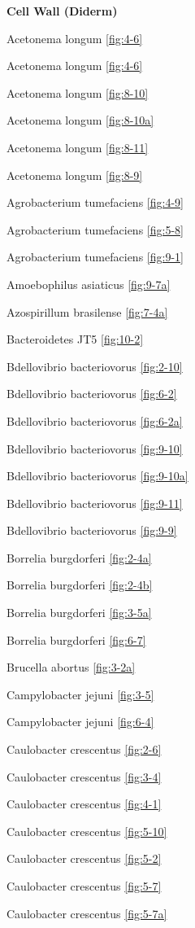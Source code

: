 \documentclass[]{tufte-book}
\begin{document}
\textbf{Cell Wall (Diderm)}

Acetonema longum \ref{fig:4-6}

Acetonema longum \ref{fig:4-6}

Acetonema longum \ref{fig:8-10}

Acetonema longum \ref{fig:8-10a}

Acetonema longum \ref{fig:8-11}

Acetonema longum \ref{fig:8-9}

Agrobacterium tumefaciens \ref{fig:4-9}

Agrobacterium tumefaciens \ref{fig:5-8}

Agrobacterium tumefaciens \ref{fig:9-1}

Amoebophilus asiaticus \ref{fig:9-7a}

Azospirillum brasilense \ref{fig:7-4a}

Bacteroidetes JT5 \ref{fig:10-2}

Bdellovibrio bacteriovorus \ref{fig:2-10}

Bdellovibrio bacteriovorus \ref{fig:6-2}

Bdellovibrio bacteriovorus \ref{fig:6-2a}

Bdellovibrio bacteriovorus \ref{fig:9-10}

Bdellovibrio bacteriovorus \ref{fig:9-10a}

Bdellovibrio bacteriovorus \ref{fig:9-11}

Bdellovibrio bacteriovorus \ref{fig:9-9}

Borrelia burgdorferi \ref{fig:2-4a}

Borrelia burgdorferi \ref{fig:2-4b}

Borrelia burgdorferi \ref{fig:3-5a}

Borrelia burgdorferi \ref{fig:6-7}

Brucella abortus \ref{fig:3-2a}

Campylobacter jejuni \ref{fig:3-5}

Campylobacter jejuni \ref{fig:6-4}

Caulobacter crescentus \ref{fig:2-6}

Caulobacter crescentus \ref{fig:3-4}

Caulobacter crescentus \ref{fig:4-1}

Caulobacter crescentus \ref{fig:5-10}

Caulobacter crescentus \ref{fig:5-2}

Caulobacter crescentus \ref{fig:5-7}

Caulobacter crescentus \ref{fig:5-7a}
\end{document}

